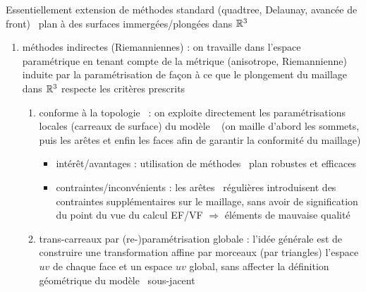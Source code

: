 Essentiellement extension de méthodes standard (\ie quadtree, Delaunay, avancée de front) \deuxD\ plan à des surfaces immergées/plongées dans $\mathbb{R}^3$
\begin{enumerate}
	\item méthodes indirectes (Riemanniennes) : on travaille dans l'espace paramétrique en tenant compte de la métrique (anisotrope, Riemannienne) induite par la paramétrisation de façon à ce que le plongement du maillage dans $\mathbb{R}^3$ respecte les critères prescrits
	\begin{enumerate}
		\item conforme à la topologie \brep\ : on exploite directement les paramétrisations locales (carreaux de surface) du modèle \brep\ \cite{borouchaki2000} (on maille d'abord les sommets, puis les arêtes et enfin les faces afin de garantir la conformité du maillage)
		\begin{itemize}
			\item intérêt/avantages : utilisation de méthodes \deuxD\ plan robustes et efficaces
			\item contraintes/inconvénients : les arêtes \brep\ régulières introduisent des contraintes supplémentaires sur le maillage, sans avoir de signification du point du vue du calcul EF/VF $\Rightarrow$ éléments de mauvaise qualité
		\end{itemize}
		\item trans-carreaux par (re-)paramétrisation globale : l'idée générale est de construire une transformation affine par morceaux (par triangles) l'espace $uv$ de chaque face et un espace $uv$ global, sans affecter la définition géométrique du modèle \brep\ sous-jacent
			\begin{enumerate}
			

\end{enumerate}
\end{enumerate}
\end{enumerate}
